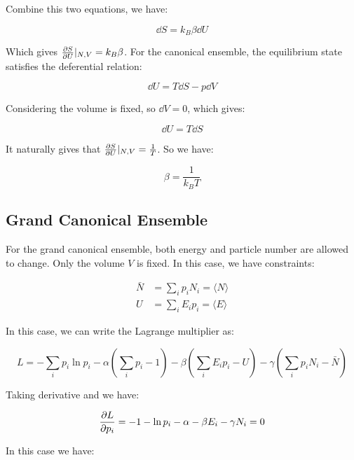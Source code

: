 \documentclass[../main.tex]{subfiles}
\begin{document}
Combine this two equations, we have:

\begin{equation}
    \dd{S} = k_B\beta \dd{U}
\end{equation}

Which gives $\pdv{S}{U}|_{N, V} = k_B\beta$. For the canonical ensemble, the equilibrium state satisfies the deferential relation:

\begin{equation}
    \dd{U} = T\dd{S} - p\dd{V}
\end{equation}

Considering the volume is fixed, so $\dd{V} = 0$, which gives:

\begin{equation}
    \dd{U} = T\dd{S}
\end{equation}

It naturally gives that $\pdv{S}{U}|_{N, V} = \frac{1}{T}$. So we have:

\begin{equation}
    \beta = \frac{1}{k_B T}
\end{equation}

\subsection{Grand Canonical Ensemble}

For the grand canonical ensemble, both energy and particle number are allowed to change. Only the volume $V$ is fixed. In this case, we have constraints:

\begin{align}
    \bar{N} &= \sum_{i} p_i N_i =\langle N \rangle \\
    U &= \sum_{i} E_i p_i = \langle E \rangle
\end{align}

In this case, we can write the Lagrange multiplier as:

\begin{equation}
    L = -\sum_{i} p_i \ln p_i - \alpha (\sum_{i} p_i - 1) - \beta (\sum_{i} E_i p_i - U) - \gamma (\sum_{i} p_i N_i - \bar{N})
\end{equation}

Taking derivative and we have:

\begin{equation}
    \pdv{L}{p_i} = -1 - \ln p_i - \alpha - \beta E_i - \gamma N_i = 0
\end{equation}

In this case we have:
\end{document}
